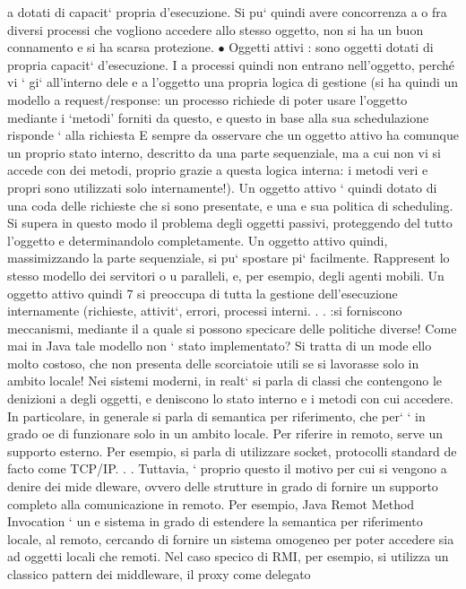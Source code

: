\documentclass[a4paper,12pt]{article}
\begin{document}
a
dotati di capacit` propria d'esecuzione. Si pu` quindi avere concorrenza
a
o
fra diversi processi che vogliono accedere allo stesso oggetto, non si ha un
buon connamento e si ha scarsa protezione.
$\bullet$ Oggetti attivi : sono oggetti dotati di propria capacit` d'esecuzione. I
a
processi quindi non entrano nell'oggetto, perché vi ` gi` all'interno dele
e a
l'oggetto una propria logica di gestione (si ha quindi un modello a request/response: un processo richiede di poter
usare l'oggetto mediante i
{`}metodi' forniti da questo, e questo in base alla sua schedulazione risponde
`
alla richiesta E sempre da osservare che un oggetto attivo ha comunque
un proprio stato interno, descritto da una parte sequenziale, ma a cui
non vi si accede con dei metodi, proprio grazie a questa logica interna: i
metodi veri e propri sono utilizzati solo internamente!). Un oggetto attivo
` quindi dotato di una coda delle richieste che si sono presentate, e una
e
sua politica di scheduling. Si supera in questo modo il problema degli
oggetti passivi, proteggendo del tutto l'oggetto e determinandolo completamente. Un oggetto attivo quindi, massimizzando
la parte sequenziale,
si pu` spostare pi` facilmente. Rappresent lo stesso modello dei servitori
o
u
paralleli, e, per esempio, degli agenti mobili. Un oggetto attivo quindi
7
\newpage
si preoccupa di tutta la gestione dell'esecuzione internamente (richieste,
attivit`, errori, processi interni. . . :si forniscono meccanismi, mediante il
a
quale si possono specicare delle politiche diverse!
Come mai in Java tale modello non ` stato implementato? Si tratta di un mode
ello molto costoso, che non presenta delle scorciatoie utili se si lavorasse solo in
ambito locale!
Nei sistemi moderni, in realt` si parla di classi che contengono le denizioni
a
degli oggetti, e deniscono lo stato interno e i metodi con cui accedere. In particolare, in generale si parla di
semantica per riferimento, che per` ` in grado
oe
di funzionare solo in un ambito locale. Per riferire in remoto, serve un supporto
esterno. Per esempio, si parla di utilizzare socket, protocolli standard de facto
come TCP/IP. . .
Tuttavia, ` proprio questo il motivo per cui si vengono a denire dei mide
dleware, ovvero delle strutture in grado di fornire un supporto completo alla
comunicazione in remoto. Per esempio, Java Remot Method Invocation ` un
e
sistema in grado di estendere la semantica per riferimento locale, al remoto,
cercando di fornire un sistema omogeneo per poter accedere sia ad oggetti locali
che remoti. Nel caso specico di RMI, per esempio, si utilizza un classico pattern dei middleware, il proxy come delegato
\end{document}
